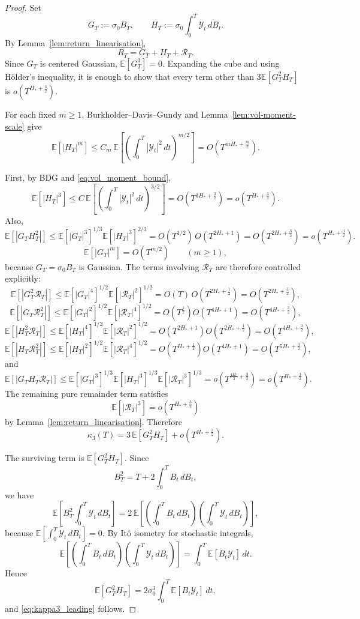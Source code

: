 \documentclass[11pt,a4paper]{amsart}
\theoremstyle{plain}
\theoremstyle{definition}
\theoremstyle{remark}
\newcommand{\EE}{\mathbb{E}}
\begin{document}
\begin{proof}
Set
\[
G_T:=\sigma_0 B_T,
\qquad
H_T:=\sigma_0\int_0^T \mathcal Y_t\,dB_t.
\]
By Lemma~\ref{lem:return_linearisation},
\[
R_T=G_T+H_T+\mathcal R_T.
\]
Since $G_T$ is centered Gaussian, $\EE[G_T^3]=0$. Expanding the cube and using H\"older's inequality, it is enough to show that every term other than $3\EE[G_T^2H_T]$ is $o(T^{H_*+\frac32})$.

For each fixed \(m\ge1\), Burkholder--Davis--Gundy and Lemma~\ref{lem:vol-moment-scale} give
\[
\EE[|H_T|^m]
\le
C_m\,\EE\!\left[\left(\int_0^T |\mathcal Y_t|^2\,dt\right)^{m/2}\right]
=
O\!\left(T^{mH_*+\frac m2}\right).
\]

First, by BDG and \eqref{eq:vol_moment_bound},
\[
\EE[|H_T|^3]
\le
C\,\EE\!\left[\left(\int_0^T |\mathcal Y_t|^2\,dt\right)^{3/2}\right]
=
O\!\left(T^{3H_*+\frac32}\right)
=
o\!\left(T^{H_*+\frac32}\right).
\]
Also,
\[
\EE[|G_T H_T^2|]
\le
\EE[|G_T|^3]^{1/3}\EE[|H_T|^3]^{2/3}
=
O(T^{1/2})\,O(T^{2H_*+1})
=
O(T^{2H_*+\frac32})
=
o(T^{H_*+\frac32}).
\]
\[
\EE[|G_T|^m]=O(T^{m/2})
\qquad (m\ge1),
\]
because \(G_T=\sigma_0B_T\) is Gaussian. The terms involving \(\mathcal R_T\) are therefore
controlled explicitly:
\[
\EE[|G_T^2\mathcal R_T|]
\le
\EE[|G_T|^4]^{1/2}\EE[|\mathcal R_T|^2]^{1/2}
=
O(T)\,O\!\left(T^{2H_*+\frac12}\right)
=
O\!\left(T^{2H_*+\frac32}\right),
\]
\[
\EE[|G_T\mathcal R_T^2|]
\le
\EE[|G_T|^2]^{1/2}\EE[|\mathcal R_T|^4]^{1/2}
=
O\!\left(T^{\frac12}\right)O\!\left(T^{4H_*+1}\right)
=
O\!\left(T^{4H_*+\frac32}\right),
\]
\[
\EE[|H_T^2\mathcal R_T|]
\le
\EE[|H_T|^4]^{1/2}\EE[|\mathcal R_T|^2]^{1/2}
=
O\!\left(T^{2H_*+1}\right)O\!\left(T^{2H_*+\frac12}\right)
=
O\!\left(T^{4H_*+\frac32}\right),
\]
\[
\EE[|H_T\mathcal R_T^2|]
\le
\EE[|H_T|^2]^{1/2}\EE[|\mathcal R_T|^4]^{1/2}
=
O\!\left(T^{H_*+\frac12}\right)O\!\left(T^{4H_*+1}\right)
=
O\!\left(T^{5H_*+\frac32}\right),
\]
and
\[
\EE[|G_TH_T\mathcal R_T|]
\le
\EE[|G_T|^3]^{1/3}\EE[|H_T|^3]^{1/3}\EE[|\mathcal R_T|^3]^{1/3}
=
o\!\left(T^{\frac{4H_*}{3}+\frac32}\right)
=
o\!\left(T^{H_*+\frac32}\right).
\]
The remaining pure remainder term satisfies
\[
\EE[|\mathcal R_T|^3]=o\!\left(T^{H_*+\frac32}\right)
\]
by Lemma~\ref{lem:return_linearisation}. Therefore
\[
\kappa_3(T)=3\,\EE[G_T^2H_T]+o(T^{H_*+\frac32}).
\]

The surviving term is $\EE[G_T^2H_T]$. Since
\[
B_T^2=T+2\int_0^T B_t\,dB_t,
\]
we have
\[
\EE\!\left[B_T^2\int_0^T \mathcal Y_t\,dB_t\right]
=
2\,\EE\!\left[\left(\int_0^T B_t\,dB_t\right)\left(\int_0^T \mathcal Y_t\,dB_t\right)\right],
\]
because $\EE[\int_0^T \mathcal Y_t\,dB_t]=0$. By It\^o isometry for stochastic integrals,
\[
\EE\!\left[\left(\int_0^T B_t\,dB_t\right)\left(\int_0^T \mathcal Y_t\,dB_t\right)\right]
=
\int_0^T \EE[B_t\mathcal Y_t]\,dt.
\]
Hence
\[
\EE[G_T^2H_T]
=
2\sigma_0^3\int_0^T \EE[B_t\mathcal Y_t]\,dt,
\]
and \eqref{eq:kappa3_leading} follows.
\end{proof}
\end{document}
